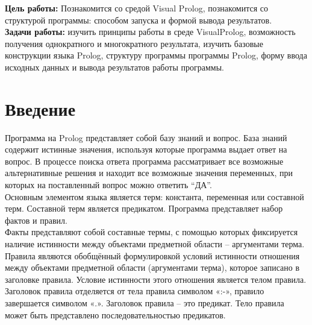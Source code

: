\documentclass[a4paper, 12pt]{article}
\begin{document}
\tableofcontents
\clearpage
\newpage

\textbf{Цель работы:} Познакомится со средой Visual Prolog, познакомится со структурой программы: способом запуска и формой вывода результатов.
\\ \hspace*{5mm} \textbf{Задачи работы:} изучить принципы работы в среде  VisualProlog, возможность получения однократного и многократного результата, изучить базовые конструкции языка Prolog, структуру программы программы Prolog, форму ввода исходных данных и вывода результатов работы программы. 

\section*{Введение}

\hspace*{5mm} Программа на Prolog представляет собой базу знаний и вопрос. База знаний содержит истинные значения, используя которые программа выдает ответ на вопрос. В процессе поиска ответа программа рассматривает все возможные альтернативные решения и находит все возможные значения переменных, при которых на поставленный вопрос можно ответить “ДА”.
\\ \hspace*{5mm} Основным элементом языка является терм: константа, переменная или составной терм. Составной терм является предикатом. Программа представляет набор фактов и правил. 
\\ \hspace*{5mm}Факты представляют собой составные термы, с помощью которых фиксируется наличие истинности между объектами предметной области – аргументами терма.
\\ \hspace*{5mm} Правила являются обобщённый формулировкой условий истинности отношения между объектами предметной области (аргументами терма), которое записано в заголовке правила. Условие истинности этого отношения является телом правила. Заголовок правила отделяется от тела правила символом «:-», правило завершается символом «.». Заголовок правила – это предикат. Тело правила может быть представлено последовательностью предикатов.
\end{document}
